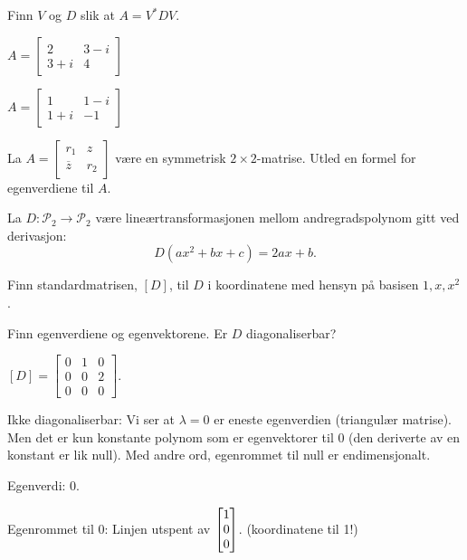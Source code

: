 \begin{oppgave}
Finn $V$ og $D$ slik at $A=V^*DV$.
\begin{punkt}
$
A=\begin{bmatrix}
2 & 3-i\\
3+i & 4
\end{bmatrix}
$
\end{punkt}
\begin{punkt}
$
A=\begin{bmatrix}
1 & 1-i\\
1+i & -1
\end{bmatrix}
$
\end{punkt}
\end{oppgave}

\begin{oppgave}
La $A=\begin{bmatrix}
r_1 & z\\
\overline{z} & r_2
\end{bmatrix}$ være en symmetrisk $2 \times 2$-matrise. Utled en formel for egenverdiene til $A$.
\end{oppgave}

\begin{oppgave}
La $D:\mathcal{P}_2\rightarrow \mathcal{P}_2$ være lineærtransformasjonen mellom andregradspolynom gitt ved derivasjon: $$D(ax^2+bx+c)=2ax+b.$$

\begin{punkt}
Finn standardmatrisen, $[D]$, til $D$ i koordinatene med hensyn på basisen $1,x,x^2$.
\end{punkt}

\begin{punkt}
Finn egenverdiene og egenvektorene. Er $D$ diagonaliserbar?
\end{punkt}

\end{oppgave}

\begin{losning}

\begin{punkt}
$[D]=\begin{bmatrix}
0 & 1 & 0\\
0 & 0 & 2\\
0 & 0 & 0
\end{bmatrix}$.
\end{punkt}

\begin{punkt}
Ikke diagonaliserbar: Vi ser at $\lambda=0$ er eneste egenverdien (triangulær matrise). Men det er kun konstante polynom som er egenvektorer til 0 (den deriverte av en konstant er lik null). Med andre ord, egenrommet til null er endimensjonalt.
\end{punkt}

\begin{punkt}
Egenverdi: 0.

\noindent
Egenrommet til 0: Linjen utspent av $\begin{bmatrix} 1 \\ 0 \\ 0 \end{bmatrix}$. (koordinatene til 1!)
\end{punkt}
\end{losning}



